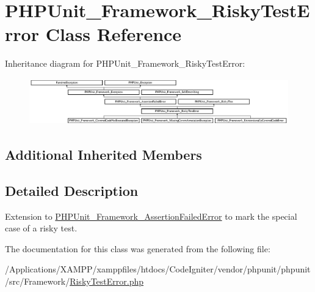 \hypertarget{class_p_h_p_unit___framework___risky_test_error}{}\section{P\+H\+P\+Unit\+\_\+\+Framework\+\_\+\+Risky\+Test\+Error Class Reference}
\label{class_p_h_p_unit___framework___risky_test_error}
Inheritance diagram for P\+H\+P\+Unit\+\_\+\+Framework\+\_\+\+Risky\+Test\+Error\+:\begin{figure}[H]
\begin{center}
\leavevmode
\includegraphics[height=2.011494cm]{class_p_h_p_unit___framework___risky_test_error}
\end{center}
\end{figure}
\subsection*{Additional Inherited Members}


\subsection{Detailed Description}
Extension to \mbox{\hyperlink{class_p_h_p_unit___framework___assertion_failed_error}{P\+H\+P\+Unit\+\_\+\+Framework\+\_\+\+Assertion\+Failed\+Error}} to mark the special case of a risky test. 

The documentation for this class was generated from the following file\+:\begin{DoxyCompactItemize}
\item 
/\+Applications/\+X\+A\+M\+P\+P/xamppfiles/htdocs/\+Code\+Igniter/vendor/phpunit/phpunit/src/\+Framework/\mbox{\hyperlink{_risky_test_error_8php}{Risky\+Test\+Error.\+php}}\end{DoxyCompactItemize}
